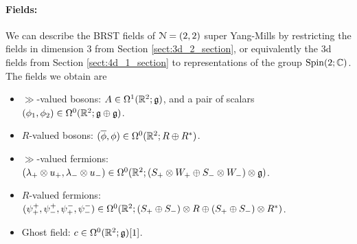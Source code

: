 \documentclass[10pt, oneside]{article}
\begin{document}
\paragraph{Fields:} We can describe the BRST fields of $\mathcal{N}=(2,2)$ super Yang-Mills by restricting the fields in dimension 3 from Section \ref{sect:3d_2_section}, or equivalently the 3d fields from Section \ref{sect:4d_1_section} to representations of the group $\mathrm{Spin}(2;\mathbb C)$.  The fields we obtain are
\begin{itemize}
 \item $\gg$-valued bosons: $A \in \Omega^1(\mathbb R^2; \mathfrak{g})$, and a pair of scalars $(\phi_1,\phi_2) \in \Omega^0(\mathbb R^2; \mathfrak{g} \oplus \mathfrak{g})$.
 \item $R$-valued bosons: $(\overline{\phi}, \phi) \in \Omega^0(\mathbb R^2 ; R \oplus R^*)$.
 \item $\gg$-valued fermions: $(\lambda_+ \otimes u_+,\lambda_- \otimes u_-) \in \Omega^0(\mathbb R^2 ; (S_+ \otimes W_+ \oplus S_- \otimes W_-) \otimes \mathfrak{g})$.
 \item $R$-valued fermions: $(\psi^+_+,\psi^+_-, \psi^-_+, \psi^-_-) \in \Omega^0(\mathbb R^2 ; (S_+ \oplus S_-) \otimes R \oplus (S_+ \oplus S_-) \otimes R^*)$.
 \item Ghost field: $c \in \Omega^0(\mathbb R^2; \mathfrak{g})[1]$.
\end{itemize}
\end{document}

